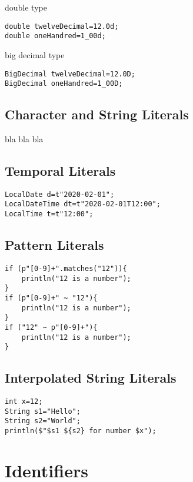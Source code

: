 \documentclass{tufte-book}
\begin{document}
double type            
\begin{lstlisting}
double twelveDecimal=12.0d;
double oneHandred=1_00d;
\end{lstlisting}


big decimal type            
\begin{lstlisting}
BigDecimal twelveDecimal=12.0D;
BigDecimal oneHandred=1_00D;
\end{lstlisting}

\subsection{Character and String Literals}
            bla bla bla
            \subsection{Temporal Literals}

            \begin{lstlisting}
LocalDate d=t"2020-02-01";
LocalDateTime dt=t"2020-02-01T12:00";
LocalTime t=t"12:00";
            \end{lstlisting}

            \subsection{Pattern Literals}
            \begin{lstlisting}
if (p"[0-9]+".matches("12")){
    println("12 is a number");
}
if (p"[0-9]+" ~ "12"){
    println("12 is a number");
}
if ("12" ~ p"[0-9]+"){
    println("12 is a number");
}
            \end{lstlisting}
            \subsection{Interpolated String Literals}
            \begin{lstlisting}
int x=12; 
String s1="Hello";
String s2="World";
println($"$s1 ${s2} for number $x");
            \end{lstlisting}
            \section{Identifiers}
\end{document}
